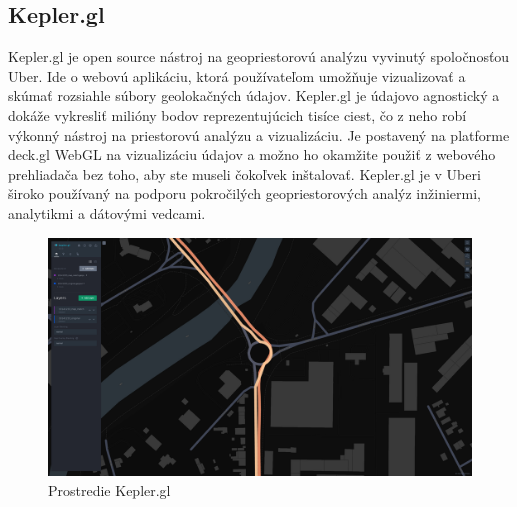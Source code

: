 \subsection{Kepler.gl}
\indent \indent Kepler.gl je open source nástroj na geopriestorovú analýzu vyvinutý spoločnosťou Uber. Ide o webovú aplikáciu, ktorá používateľom umožňuje vizualizovať a skúmať rozsiahle súbory geolokačných údajov. Kepler.gl je údajovo agnostický a dokáže vykresliť milióny bodov reprezentujúcich tisíce ciest, čo z neho robí výkonný nástroj na priestorovú analýzu a vizualizáciu. Je postavený na platforme deck.gl WebGL na vizualizáciu údajov a možno ho okamžite použiť z webového prehliadača bez toho, aby ste museli čokoľvek inštalovať. Kepler.gl je v Uberi široko používaný na podporu pokročilých geopriestorových analýz inžiniermi, analytikmi a dátovými vedcami\cite{kepler1}\cite{kepler2}\cite{kepler3}.
\begin{figure}[H]
    \centering
    \includegraphics[width = \linewidth]{img/kepler.png}
    \caption{Prostredie Kepler.gl}
\end{figure}
